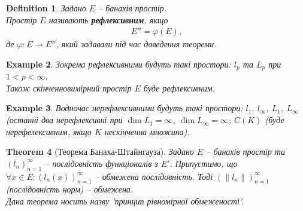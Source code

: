 \documentclass[a4paper, 10pt]{article}
\theoremstyle{theoremdd}
\newtheorem{theorem}{Theorem}[subsection]
\theoremstyle{theoremdd}
\newtheorem{definition}[theorem]{Definition}
\theoremstyle{theoremdd}
\theoremstyle{theoremdd}
\newtheorem{example}[theorem]{Example}
\theoremstyle{theoremdd}
\theoremstyle{theoremdd}
\theoremstyle{theoremdd}
\theoremstyle{theoremdd}
\begin{document}
\begin{definition}
Задано $E$ -- банахів простір.\\
Простір $E$ називають \textbf{рефлексивним}, якщо
\begin{align*}
E'' = \varphi(E),
\end{align*}
де $\varphi \colon E \to E''$, який задавали під час доведення теореми.
\end{definition}

\begin{example}
Зокрема рефлексивними будуть такі простори: $l_p$ та $L_p$ при $1 < p < \infty$.\\
Також скінченновимірний простір $E$ буде рефлексивним.
\end{example}

\begin{example}
Водночас нерефлексивними будуть такі простори: $l_1,\ l_\infty,\ L_1,\ L_\infty$ (останні два нерефлексивні при $\dim L_1 = \infty$, $\dim L_\infty = \infty$; $C(K)$ (буде нерефелексивним, якщо $K$ нескінченна множина).
\end{example}

\begin{theorem}[Теорема Банаха-Штайнгауза]
Задано $E$ -- банахів простір та $(l_n)_{n=1}^\infty$ -- послідовність функціоналів з $E'$. Припустимо, що $\forall x \in E: (l_n(x))_{n=1}^\infty$ -- обмежена послідовність. Тоді $(\|l_n\|)_{n=1}^\infty$ (послідовність норм) -- обмежена.\\
\textit{Дана теорема носить назву 'принцип рівномірної обмеженості'.}
\end{theorem}
\end{document}
